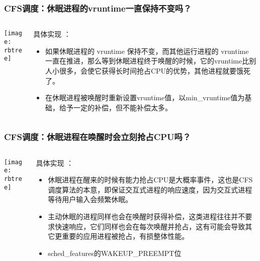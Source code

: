 \begin{frame}
	\frametitle{CFS调度：休眠进程的vruntime一直保持不变吗？}
	\begin{columns}
		\begin{column}{.4\textwidth}
			\Large \centering
			
			\texttt{[image: rbtree]}
			
		\end{column} \pause
		
		\begin{column}{.6\textwidth}
			
			具体实现 ：
			\begin{itemize}
				\item 如果休眠进程的 vruntime 保持不变，而其他运行进程的 vruntime 一直在推进，那么等到休眠进程终于唤醒的时候，它的vruntime比别人小很多，会使它获得长时间抢占CPU的优势，其他进程就要饿死了。

				\item 在休眠进程被唤醒时重新设置vruntime值，以min\_vruntime值为基础，给予一定的补偿，但不能补偿太多。
			\end{itemize}
		\end{column}
	\end{columns}
\end{frame}


\begin{frame}
	\frametitle{CFS调度：休眠进程在唤醒时会立刻抢占CPU吗？}
	\begin{columns}
		\begin{column}{.4\textwidth}
			\Large \centering
			
			\texttt{[image: rbtree]}
			
		\end{column} \pause
		
		\begin{column}{.6\textwidth}
			
			具体实现 ：
			\begin{itemize}
				\item 休眠进程在醒来的时候有能力抢占CPU是大概率事件，这也是CFS调度算法的本意，即保证交互式进程的响应速度，因为交互式进程等待用户输入会频繁休眠。
				
				\item 主动休眠的进程同样也会在唤醒时获得补偿，这类进程往往并不要求快速响应，它们同样也会在每次唤醒并抢占，这有可能会导致其它更重要的应用进程被抢占，有损整体性能。
				\item sched\_features的WAKEUP\_PREEMPT位
				
			\end{itemize}
		\end{column}
	\end{columns}
\end{frame}


